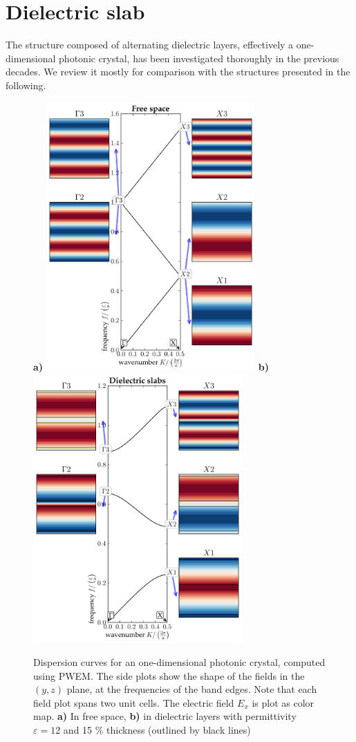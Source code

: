 \label{section_result}
\section{Dielectric slab} %
The structure composed of alternating dielectric layers, effectively a one-dimensional photonic crystal, has been investigated thoroughly in the previous decades. We review it mostly for comparison with the structures presented in the following. 

\begin{figure}[ht] \caption{Dispersion curves for an one-dimensional photonic crystal, computed using PWEM. The side plots show the shape of the fields in the $(y,z)$ plane, at the frequencies of the band edges. Note that each field plot spans two unit cells. The electric field $E_x$ is plot as color map. \textbf{a)} In free space, \textbf{b)} in dielectric layers with permittivity $\varepsilon = 12$ and 15 \% thickness (outlined by black lines)} \label{fg_1dbd} \centering 
\textbf{a)}	\includegraphics[width=8cm]{img/Slab_eps001_PWEM.pdf}
\textbf{b)}	\includegraphics[width=8cm]{img/Slab_eps012_d15.pdf}
\end{figure}

